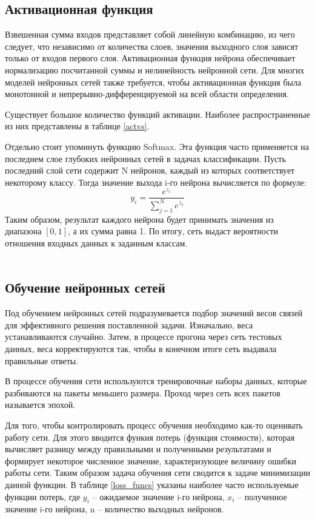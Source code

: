 \subsection{Активационная функция}
\label{sec:activation}
Взвешенная сумма входов представляет собой линейную комбинацию, из чего следует, что независимо от количества слоев, значения выходного слоя зависят только от входов первого слоя. 
Активационная функция нейрона обеспечивает нормализацию посчитанной суммы и нелинейность нейронной сети. Для многих моделей нейронных сетей также требуется, чтобы активационная функция была монотонной и непрерывно-дифференцируемой на всей области определения.

Существует большое количество функций активации. Наиболее распространенные из них представлены в таблице \ref{actvs}.



Отдельно стоит упоминуть функцию Softmax. Эта функция часто применяется на последнем слое глубоких нейронных сетей в задачах классификации. Пусть последний слой сети содержит N нейронов, каждый из которых соответствует некоторому классу. Тогда значение выхода i-го нейрона вычисляется по формуле: 
\[
    y_i=\frac{e^{z_i}}{\sum\limits_{j=1}^{N}e^{z_j}}
\]
Таким образом, результат каждого нейрона будет принимать значения из диапазона $[0,1]$, а их сумма равна 1. По итогу, сеть выдаст вероятности отношения входных данных к заданным классам.
\\\\
\subsection{Обучение нейронных сетей}
Под обучением нейронных сетей подразумевается подбор значений весов связей для эффективного решения поставленной задачи. Изначально, веса устанавливаются случайно. Затем, в процессе прогона через сеть тестовых данных, веса корректируются так, чтобы в конечном итоге сеть выдавала правильные ответы. 

В процессе обучения сети используются тренировочные наборы данных, которые разбиваются на пакеты меньшего размера. Проход через сеть всех пакетов называется эпохой.

Для того, чтобы контролировать процесс обучения необходимо как-то оценивать работу сети. Для этого вводится функия потерь (функция стоимости), которая вычисляет разницу между правильными и полученными результатами и формирует некоторое численное значение, характеризующее величину ошибки работы сети. Таким образом задача обучения сети сводится к задаче минимизации данной функции. В таблице \ref{loss_funcs} указаны наиболее часто используемые функции потерь, где $y_i$ – ожидаемое значение i-го нейрона, $x_i$ – полученное значение i-го нейрона, n – количество выходных нейронов.

